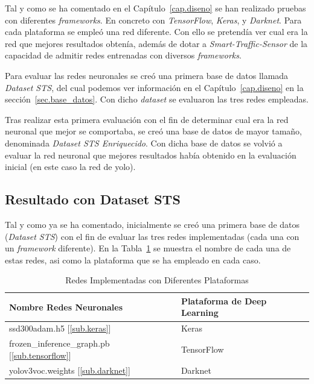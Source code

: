 Tal y como se ha comentado en el Capítulo~\ref{cap.diseno} se han realizado pruebas con diferentes \textit{frameworks}. En concreto con \textit{TensorFlow}, \textit{Keras}, y \textit{Darknet}. Para cada plataforma se empleó una red diferente. Con ello se pretendía ver cual era la red que mejores resultados obtenía, además de dotar a \textit{Smart-Traffic-Sensor} de la capacidad de admitir redes entrenadas con diversos \textit{frameworks}.

Para evaluar las redes neuronales se creó una primera base de datos llamada \textit{Dataset STS}, del cual podemos ver información en el Capítulo~\ref{cap.diseno} en la sección~\ref{sec.base_datos}. Con dicho \textit{dataset} se evaluaron las tres redes empleadas.

Tras realizar esta primera evaluación con el fin de determinar cual era la red neuronal que mejor se comportaba, se creó una base de datos de mayor tamaño, denominada \textit{Dataset STS Enriquecido}. Con dicha base de datos se volvió a evaluar la red neuronal que mejores resultados había obtenido en la evaluación inicial (en este caso la red de \acrshort{yolo}).

\subsection{Resultado con Dataset STS}

Tal y como ya se ha comentado, inicialmente se creó una primera base de datos (\textit{Dataset STS}) con el fin de evaluar las tres redes implementadas (cada una con un \textit{framework} diferente). En la Tabla~\ref{tabla_redes_plataformas} se muestra el nombre de cada una de estas redes, asi como la plataforma que se ha empleado en cada caso.

\begin{table}[H] 
\begin{center}
\begin{tabular}{|l|l|}
\hline
Nombre Redes Neuronales & Plataforma de Deep Learning \\ 
\hline \hline
ssd300adam.h5 [\ref{sub.keras}] & Keras \\ \hline
frozen\_inference\_graph.pb [\ref{sub.tensorflow}] & TensorFlow \\ \hline
yolov3\-voc.weights [\ref{sub.darknet}] & Darknet \\ \hline
\end{tabular}
\caption{Redes Implementadas con Diferentes Plataformas}
\label{tabla_redes_plataformas}
\end{center}
\end{table}

